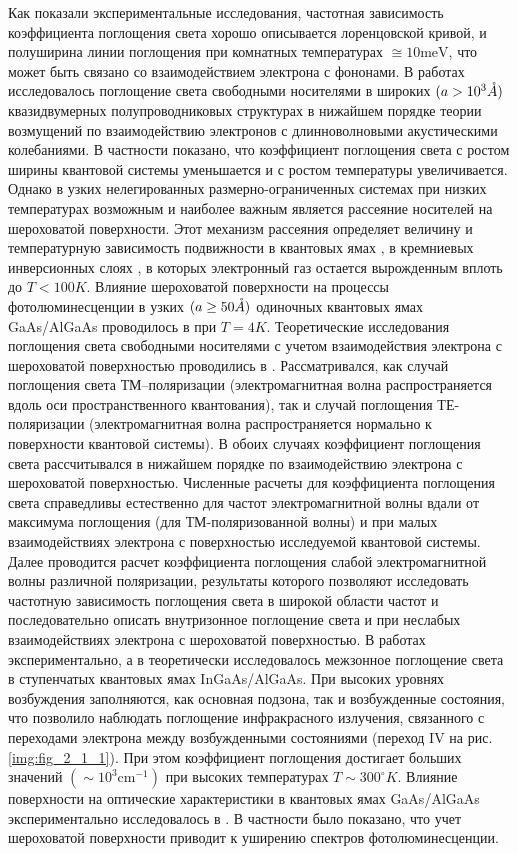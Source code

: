 Как показали экспериментальные исследования, частотная зависимость коэффициента поглощения света хорошо описывается лоренцовской кривой, и полуширина линии поглощения при комнатных температурах $\cong 10 \text{meV}$, что может быть связано со взаимодействием электрона с фононами. В работах \cite{Wu1994,Spector1983} исследовалось поглощение света свободными носителями в широких $(a > 10^3 \AA)$ квазидвумерных полупроводниковых структурах в нижайшем порядке теории возмущений по взаимодействию электронов с длинноволновыми акустическими колебаниями. В частности показано, что коэффициент поглощения света с ростом ширины квантовой системы уменьшается и с ростом температуры увеличивается. Однако в узких нелегированных размерно-ограниченных системах при низких температурах возможным и наиболее важным является рассеяние носителей на шероховатой поверхности. Этот механизм рассеяния определяет величину и температурную зависимость подвижности в квантовых ямах \cite{Sakaki1987}, в кремниевых инверсионных слоях \cite{Stern1980}, в которых электронный газ остается вырожденным вплоть до $T < 100 K$. Влияние шероховатой поверхности на процессы фотолюминесценции в узких $(a \geq 50 \AA)$ одиночных квантовых ямах GaAs/AlGaAs  проводилось в \cite{Gurioli1991} при $T = 4 K$. Теоретические исследования поглощения света свободными носителями с учетом взаимодействия электрона с шероховатой поверхностью проводились в \cite{Vurgaftman1999}. Рассматривался, как случай поглощения света ТМ–поляризации (электромагнитная волна распространяется вдоль оси пространственного квантования), так и случай поглощения ТЕ-поляризации (электромагнитная волна распространяется нормально к поверхности квантовой системы). В обоих случаях коэффициент поглощения света рассчитывался в нижайшем порядке по взаимодействию электрона с шероховатой поверхностью. Численные расчеты для коэффициента поглощения света справедливы естественно для частот электромагнитной волны вдали от максимума поглощения (для ТМ-поляризованной волны) и при малых взаимодействиях электрона с поверхностью исследуемой квантовой системы. Далее проводится расчет коэффициента поглощения слабой электромагнитной волны различной поляризации, результаты которого позволяют исследовать частотную зависимость поглощения света в широкой области частот и последовательно описать внутризонное поглощение света и при неслабых взаимодействиях электрона с шероховатой поверхностью.
В работах \cite{Aleshkin2002,Vorobiev2004} экспериментально, а в \cite{Thammasat1997} теоретически исследовалось межзонное поглощение света в ступенчатых квантовых ямах InGaAs/AlGaAs. При высоких уровнях возбуждения заполняются, как основная подзона, так и возбужденные состояния, что позволило наблюдать поглощение инфракрасного излучения, связанного с переходами электрона между возбужденными состояниями (переход IV на рис. \ref{img:fig_2_1_1}). При этом коэффициент поглощения достигает больших значений $(\sim 10^3 \text{cm}^{-1})$ при высоких температурах $T\sim300^{\circ}K$. Влияние поверхности на оптические характеристики в квантовых ямах GaAs/AlGaAs экспериментально исследовалось в \cite{Gurioli1991,Weisbuch1981}. В частности было показано, что учет шероховатой поверхности приводит к уширению спектров фотолюминесценции.	
			
